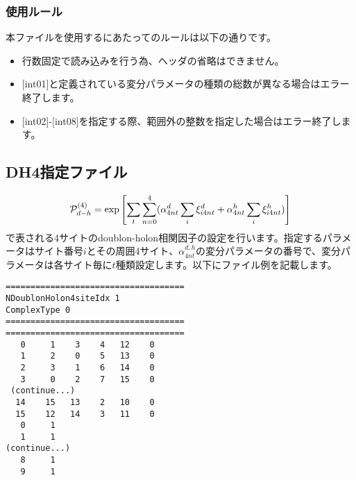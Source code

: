 \subsubsection{使用ルール}
本ファイルを使用するにあたってのルールは以下の通りです。
\begin{itemize}
\item 行数固定で読み込みを行う為、ヘッダの省略はできません。
\item $[$int01$]$と定義されている変分パラメータの種類の総数が異なる場合はエラー終了します。
\item $[$int02$]$-$[$int08$]$を指定する際、範囲外の整数を指定した場合はエラー終了します。
\end{itemize}


\newpage
\subsection{DH4指定ファイル}
\label{Subsec:DH4}

\begin{equation}
{\cal P}_{d-h}^{(4)}= \exp \left[ \sum_t \sum_{n=0}^4 (\alpha_{4nt}^d \sum_{i}\xi_{i4nt}^d+\alpha_{4nt}^h \sum_{i}\xi_{i4nt}^h)\right]
\end{equation}
で表される4サイトのdoublon-holon相関因子の設定を行います。指定するパラメータはサイト番号$i$とその周囲4サイト、$\alpha_{4nt}^{d,h}$の変分パラメータの番号で、変分パラメータは各サイト毎に$t$種類設定します。以下にファイル例を記載します。

\begin{minipage}{12.5cm}
\begin{screen}
\begin{verbatim}
====================================
NDoublonHolon4siteIdx 1  
ComplexType 0
====================================
====================================
   0     1    3    4   12    0
   1     2    0    5   13    0
   2     3    1    6   14    0
   3     0    2    7   15    0
 (continue...)
  14    15   13    2   10    0
  15    12   14    3   11    0
   0     1 
   1     1 
(continue...)
   8     1 
   9     1 
\end{verbatim}
\end{screen}
\end{minipage}

